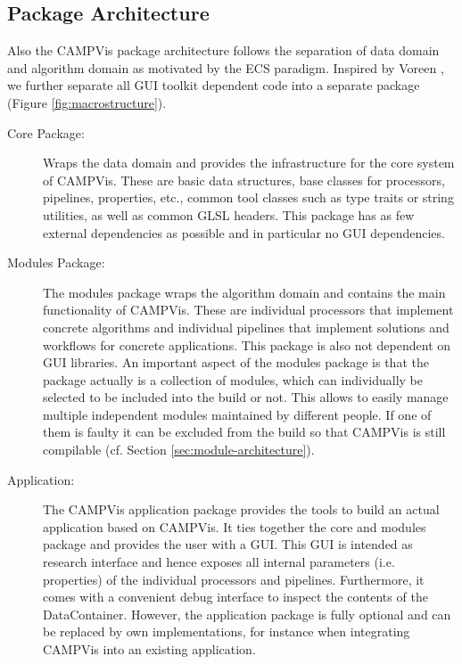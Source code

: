 \subsection{Package Architecture}
Also the CAMPVis package architecture follows the separation of data domain and algorithm domain as motivated by the ECS paradigm. 
Inspired by Voreen \cite{Voreen09}, we further separate all GUI toolkit dependent code into a separate package (Figure \ref{fig:macrostructure}).

\begin{description}
	\item[Core Package:]
	Wraps the data domain and provides the infrastructure for the core system of CAMPVis. 
	These are basic data structures, base classes for processors, pipelines, properties, etc., common tool classes such as type traits or string utilities, as well as common GLSL headers.
	This package has as few external dependencies as possible and in particular no GUI dependencies.
	
	\item[Modules Package:]
	The modules package wraps the algorithm domain and contains the main functionality of CAMPVis. 
	These are individual processors that implement concrete algorithms and individual pipelines that implement solutions and workflows for concrete applications.
	This package is also not dependent on GUI libraries.
	An important aspect of the modules package is that the package actually is a collection of modules, which can individually be selected to be included into the build or not.
	This allows to easily manage multiple independent modules maintained by different people.
	If one of them is faulty it can be excluded from the build so that CAMPVis is still compilable (cf. Section \ref{sec:module-architecture}).
	
	\item[Application:]
	The CAMPVis application package provides the tools to build an actual application based on CAMPVis.
	It ties together the core and modules package and provides the user with a GUI.
	This GUI is intended as research interface and hence exposes all internal parameters (i.e. properties) of the individual processors and pipelines.
	Furthermore, it comes with a convenient debug interface to inspect the contents of the DataContainer.
	However, the application package is fully optional and can be replaced by own implementations, for instance when integrating CAMPVis into an existing application.
\end{description}


